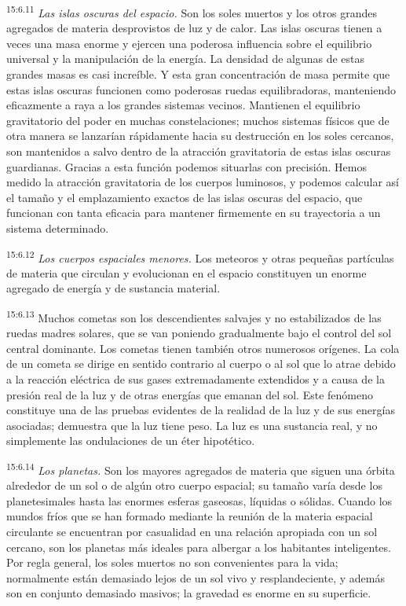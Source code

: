 \par
\textsuperscript{15:6.11} \textit{Las islas oscuras del espacio.} Son los soles muertos y los otros grandes agregados de materia desprovistos de luz y de calor. Las islas oscuras tienen a veces una masa enorme y ejercen una poderosa influencia sobre el equilibrio universal y la manipulación de la energía. La densidad de algunas de estas grandes masas es casi increíble. Y esta gran concentración de masa permite que estas islas oscuras funcionen como poderosas ruedas equilibradoras, manteniendo eficazmente a raya a los grandes sistemas vecinos. Mantienen el equilibrio gravitatorio del poder en muchas constelaciones; muchos sistemas físicos que de otra manera se lanzarían rápidamente hacia su destrucción en los soles cercanos, son mantenidos a salvo dentro de la atracción gravitatoria de estas islas oscuras guardianas. Gracias a esta función podemos situarlas con precisión. Hemos medido la atracción gravitatoria de los cuerpos luminosos, y podemos calcular así el tamaño y el emplazamiento exactos de las islas oscuras del espacio, que funcionan con tanta eficacia para mantener firmemente en su trayectoria a un sistema determinado.

\par
\textsuperscript{15:6.12} \textit{Los cuerpos espaciales menores.} Los meteoros y otras pequeñas partículas de materia que circulan y evolucionan en el espacio constituyen un enorme agregado de energía y de sustancia material.

\par
\textsuperscript{15:6.13} Muchos cometas son los descendientes salvajes y no estabilizados de las ruedas madres solares, que se van poniendo gradualmente bajo el control del sol central dominante. Los cometas tienen también otros numerosos orígenes. La cola de un cometa se dirige en sentido contrario al cuerpo o al sol que lo atrae debido a la reacción eléctrica de sus gases extremadamente extendidos y a causa de la presión real de la luz y de otras energías que emanan del sol. Este fenómeno constituye una de las pruebas evidentes de la realidad de la luz y de sus energías asociadas; demuestra que la luz tiene peso. La luz es una sustancia real, y no simplemente las ondulaciones de un éter hipotético.

\par
\textsuperscript{15:6.14} \textit{Los planetas.} Son los mayores agregados de materia que siguen una órbita alrededor de un sol o de algún otro cuerpo espacial; su tamaño varía desde los planetesimales hasta las enormes esferas gaseosas, líquidas o sólidas. Cuando los mundos fríos que se han formado mediante la reunión de la materia espacial circulante se encuentran por casualidad en una relación apropiada con un sol cercano, son los planetas más ideales para albergar a los habitantes inteligentes. Por regla general, los soles muertos no son convenientes para la vida; normalmente están demasiado lejos de un sol vivo y resplandeciente, y además son en conjunto demasiado masivos; la gravedad es enorme en su superficie.

